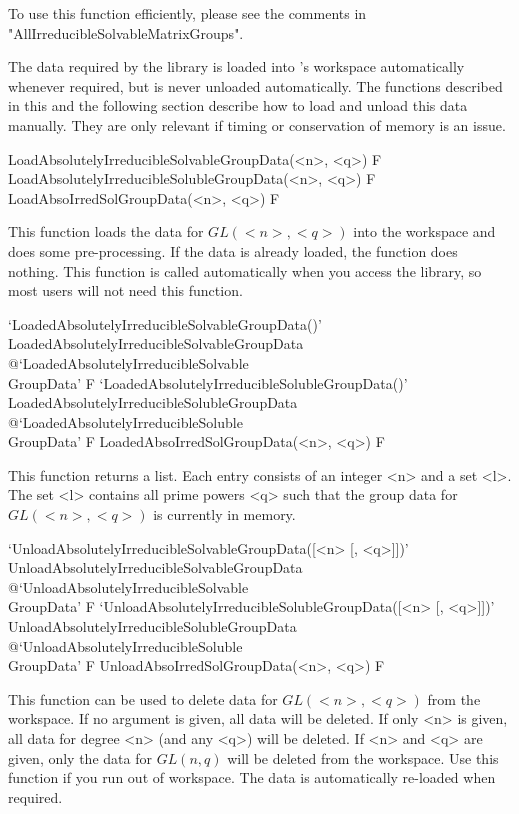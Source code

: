 To use this function efficiently, please see the comments in 
"AllIrreducibleSolvableMatrixGroups".



The data required by the {\IRREDSOL} library is loaded into {\GAP}'s workspace automatically whenever required, but is never unloaded automatically. The functions described in this
and the following section describe how to load and unload this data manually. 
They are only relevant if timing or conservation of memory is an issue.

\>LoadAbsolutelyIrreducibleSolvableGroupData(<n>, <q>) F
\>LoadAbsolutelyIrreducibleSolubleGroupData(<n>, <q>) F
\>LoadAbsoIrredSolGroupData(<n>, <q>) F

This function loads the data for $GL(<n>, <q>)$ into the {\GAP} workspace and does 
some pre-processing. If the data is already loaded, the function does nothing. This 
function is called automatically when you access the
{\IRREDSOL} library, so most users  will not need this function.

\>`LoadedAbsolutelyIrreducibleSolvableGroupData()'%
{LoadedAbsolutelyIrreducibleSolvableGroupData}%
@{`LoadedAbsolutelyIrreducibleSolvable\\GroupData'} F
\>`LoadedAbsolutelyIrreducibleSolubleGroupData()'%
{LoadedAbsolutelyIrreducibleSolubleGroupData}%
@{`LoadedAbsolutelyIrreducibleSoluble\\GroupData'} F
\>LoadedAbsoIrredSolGroupData(<n>, <q>) F

This function returns a list. Each entry consists of an integer <n> and a set <l>. The set
<l> contains all prime powers <q> such that the group data for $GL(<n>, <q>)$ is currently in memory.

\>`UnloadAbsolutelyIrreducibleSolvableGroupData([<n> [, <q>]])'%
{UnloadAbsolutelyIrreducibleSolvableGroupData}%
@{`UnloadAbsolutelyIrreducibleSolvable\\GroupData'} F
\>`UnloadAbsolutelyIrreducibleSolubleGroupData([<n> [, <q>]])'%
{UnloadAbsolutelyIrreducibleSolubleGroupData}%
@{`UnloadAbsolutelyIrreducibleSoluble\\GroupData'} F
\>UnloadAbsoIrredSolGroupData(<n>, <q>) F

This function can be used to delete data for $GL(<n>, <q>)$ from the {\GAP} workspace. If no argument
is given, all data will be deleted. If only <n> is given, all data for degree <n> (and any <q>) will
be deleted. If <n> and <q> are given, only the data for $GL(n, q)$ will be deleted from the {\GAP}
workspace. Use this function if you run out of {\GAP} workspace. The
data is automatically re-loaded when required.


